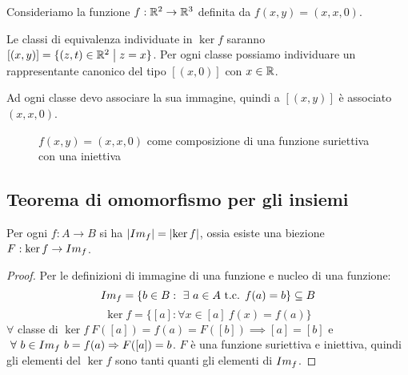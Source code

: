 \begin{exmp}
Consideriamo la funzione $f : \mathbb{R}^2 \to \mathbb{R}^3$ definita da $f(x,y) = (x,x,0)$.

Le classi di equivalenza individuate in $\ker f$ saranno $[(x,y)] = \{ (z,t) \in \mathbb{R}^2 \bigm| z = x\}$. Per ogni classe possiamo individuare un rappresentante canonico del tipo $[(x,0)]$ con $x \in \mathbb{R}$.

Ad ogni classe devo associare la sua immagine, quindi a $[(x,y)]$ \`e associato $(x,x,0)$.
\end{exmp}
\begin{figure}[ht]
\centering
{}
\caption{$f(x,y) = (x,x,0)$ come composizione di una funzione suriettiva con una iniettiva}
\end{figure}

\subsection{Teorema di omomorfismo per gli insiemi}
\begin{prop}
Per ogni $f : A \to B$ si ha $\left\lvert{Im_{f}}\right\rvert = \left\lvert{\ker f}\right\rvert$, ossia esiste una biezione $F : \ker f \to Im_{f}$.
\end{prop}
\begin{proof}
Per le definizioni di immagine di una funzione e nucleo di una funzione:
\[
\image{f} = \{ b \in B : \exists a \in A \text{ t.c. } f(a) = b \}\subseteq B
\]
\[
\ker f = \{ [a] : \forall x \in [a] \ f(x) = f(a) \}
\]
$ \forall $ classe di $ \ker f \ F([a]) = f(a) = F([b]) \implies [a] = [b]$ e $\forall b \in \image{f} \ b = f(a) \implies F([a]) = b$. $F$ \`e una funzione suriettiva e iniettiva, quindi gli elementi del $\ker f$ sono tanti quanti gli elementi di $Im_{f}$.
\end{proof}

